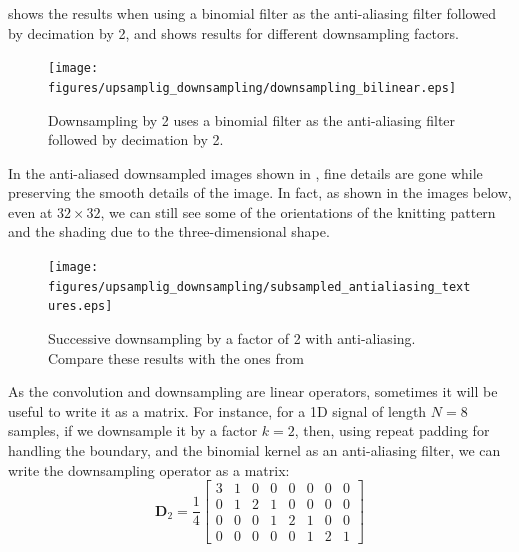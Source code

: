 \Fig{\ref{fig:downsampling_bilinear}} shows the results when using a binomial filter as the anti-aliasing filter followed by decimation by 2, and \fig{\ref{fig:subsampled_antialiasing_textures}} shows results for different downsampling factors.



\begin{figure}[t]
	\centerline{
		\texttt{[image: figures/upsamplig\_downsampling/downsampling\_bilinear.eps]}
	}
	\caption{Downsampling by 2 uses a binomial filter as the anti-aliasing filter followed by decimation by 2.}
	\label{fig:downsampling_bilinear}
\end{figure}

In the anti-aliased downsampled images shown in \fig{\ref{fig:subsampled_antialiasing_textures}}, fine details are gone while preserving the smooth details of the image. In fact, as shown in the images below, even at $32 \times 32$, we can still see some of the orientations of the knitting pattern and the shading due to the three-dimensional shape.

\begin{figure}[t]
	\centerline{
		\texttt{[image: figures/upsamplig\_downsampling/subsampled\_antialiasing\_textures.eps]}
	}
	\caption{Successive downsampling by a factor of 2 with anti-aliasing. Compare these results with the ones from \fig{\ref{fig:subsampled_textures}}}
	\label{fig:subsampled_antialiasing_textures}
\end{figure}


As the convolution and downsampling are linear operators, sometimes it will be useful to write it as a matrix. For instance, for a 1D signal of length $N=8$  samples, if we downsample it by a factor $k=2$, then, using repeat padding for handling the boundary, and the binomial kernel as an anti-aliasing filter, we can write the downsampling operator as a matrix:
\begin{equation}
	\mathbf{D}_2 = \frac{1}{4} \left[
		\begin{array}{cccccccc}
			3 & 1 & 0 & 0 & 0 & 0 & 0 & 0 \\
			0 & 1 & 2 & 1 & 0 & 0 & 0 & 0 \\
			0 & 0 & 0 & 1 & 2 & 1 & 0 & 0 \\
			0 & 0 & 0 & 0 & 0 & 1 & 2 & 1
		\end{array}
		\right]
\end{equation}

